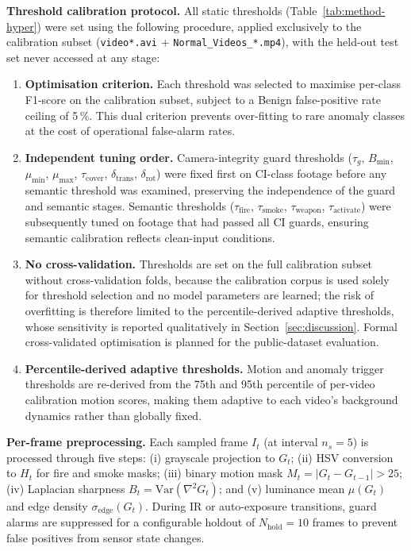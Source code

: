 \documentclass[sensors,article,submit,pdftex,moreauthors]{Definitions/mdpi}
\begin{document}
\textbf{Threshold calibration protocol.}
All static thresholds (Table~\ref{tab:method-hyper}) were set using the following procedure, applied exclusively to the calibration subset (\texttt{video*.avi} + \texttt{Normal\_Videos\_*.mp4}), with the held-out test set never accessed at any stage:
\begin{enumerate}[leftmargin=2em,itemsep=0pt]
  \item \textbf{Optimisation criterion.} Each threshold was selected to maximise per-class F1-score on the calibration subset, subject to a Benign false-positive rate ceiling of 5\,\%. This dual criterion prevents over-fitting to rare anomaly classes at the cost of operational false-alarm rates.
  \item \textbf{Independent tuning order.} Camera-integrity guard thresholds ($\tau_g$, $B_{\min}$, $\mu_{\min}$, $\mu_{\max}$, $\tau_{\text{cover}}$, $\delta_{\text{trans}}$, $\delta_{\text{rot}}$) were fixed first on CI-class footage before any semantic threshold was examined, preserving the independence of the guard and semantic stages. Semantic thresholds ($\tau_{\text{fire}}$, $\tau_{\text{smoke}}$, $\tau_{\text{weapon}}$, $\tau_{\text{activate}}$) were subsequently tuned on footage that had passed all CI guards, ensuring semantic calibration reflects clean-input conditions.
  \item \textbf{No cross-validation.} Thresholds are set on the full calibration subset without cross-validation folds, because the calibration corpus is used solely for threshold selection and no model parameters are learned; the risk of overfitting is therefore limited to the percentile-derived adaptive thresholds, whose sensitivity is reported qualitatively in Section~\ref{sec:discussion}. Formal cross-validated optimisation is planned for the public-dataset evaluation.
  \item \textbf{Percentile-derived adaptive thresholds.} Motion and anomaly trigger thresholds are re-derived from the 75th and 95th percentile of per-video calibration motion scores, making them adaptive to each video's background dynamics rather than globally fixed.
\end{enumerate}
 
\textbf{Per-frame preprocessing.} Each sampled frame $I_t$ (at interval $n_s = 5$) is processed through five steps: (i) grayscale projection to $G_t$; (ii) HSV conversion to $H_t$ for fire and smoke masks; (iii) binary motion mask $M_t = |G_t - G_{t-1}| > 25$; (iv) Laplacian sharpness $B_t = \mathrm{Var}(\nabla^2 G_t)$; and (v) luminance mean $\mu(G_t)$ and edge density $\sigma_{\text{edge}}(G_t)$. During IR or auto-exposure transitions, guard alarms are suppressed for a configurable holdout of $N_{\text{hold}} = 10$ frames to prevent false positives from sensor state changes.
 
\end{document}
